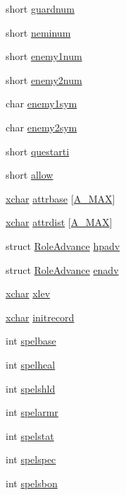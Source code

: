 \begin{DoxyCompactItemize}
short \hyperlink{structRole_a3bd52e2bb34943b6f68757fadf6fe6fb}{guardnum}
\item 
short \hyperlink{structRole_aec68a6097bd49a6e67141282f92ad09c}{neminum}
\item 
short \hyperlink{structRole_afd83037707f346bb77d598d7127d91c7}{enemy1num}
\item 
short \hyperlink{structRole_aaf0a9b355748df254a91e298e7fc1d08}{enemy2num}
\item 
char \hyperlink{structRole_af9435006074321c68acd62a0984e6aa3}{enemy1sym}
\item 
char \hyperlink{structRole_a9d080791fa1390a00f02d3cd16b63940}{enemy2sym}
\item 
short \hyperlink{structRole_af3333d55b15fae9edb56c414ecc9ccf3}{questarti}
\item 
short \hyperlink{structRole_a971fdc715375fa65fd70999351fbbadc}{allow}
\item 
\hyperlink{global_8h_a2043b7d01ce89f4ee2fa6c345a752d32}{xchar} \hyperlink{structRole_ac28153e1a38eb9abf7a02a37b8fabe6d}{attrbase} \mbox{[}\hyperlink{attrib_8h_a8f8289cfc29e0bb2a2626262bfeedf21}{A\+\_\+\+M\+A\+X}\mbox{]}
\item 
\hyperlink{global_8h_a2043b7d01ce89f4ee2fa6c345a752d32}{xchar} \hyperlink{structRole_a4c4ea3098e99e939a3a296ae86fca9f1}{attrdist} \mbox{[}\hyperlink{attrib_8h_a8f8289cfc29e0bb2a2626262bfeedf21}{A\+\_\+\+M\+A\+X}\mbox{]}
\item 
struct \hyperlink{structRoleAdvance}{Role\+Advance} \hyperlink{structRole_a999b8055b41091d235626dd383d2fa72}{hpadv}
\item 
struct \hyperlink{structRoleAdvance}{Role\+Advance} \hyperlink{structRole_a2d3cca1a7a810a18e8ed147b51be5e2f}{enadv}
\item 
\hyperlink{global_8h_a2043b7d01ce89f4ee2fa6c345a752d32}{xchar} \hyperlink{structRole_a5628cbf5b1b658077beb6563cf3dd460}{xlev}
\item 
\hyperlink{global_8h_a2043b7d01ce89f4ee2fa6c345a752d32}{xchar} \hyperlink{structRole_a7f358ddd01aad9183c8f109e7fd6bac6}{initrecord}
\item 
int \hyperlink{structRole_a419bd7e1a3ef7270cede02614de91119}{spelbase}
\item 
int \hyperlink{structRole_a2f0221b5b961d1898eba6d6e5d19d5c2}{spelheal}
\item 
int \hyperlink{structRole_a57bc24c9f9dfe0307edbeaa06f5e444d}{spelshld}
\item 
int \hyperlink{structRole_ad8ed198d77085f02936e9acc576588c8}{spelarmr}
\item 
int \hyperlink{structRole_a2734f2aade75628f8d606ed389491522}{spelstat}
\item 
int \hyperlink{structRole_a35fdcf893188c27f4bcdb4c13d408261}{spelspec}
\item 
int \hyperlink{structRole_ab004ef3778c833bcf4d40e36a4a242ce}{spelsbon}
\end{DoxyCompactItemize}


